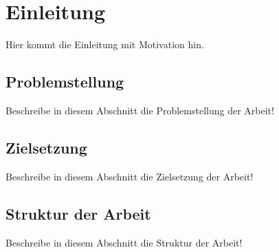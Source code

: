 %
%
%
%
\chapter{Einleitung}
\label{cha:einleitung}
Hier kommt die Einleitung mit Motivation hin.

\section{Problemstellung}
\label{sec:einleitung:problemstellung}
Beschreibe in diesem Abschnitt die Problemstellung der Arbeit!

\section{Zielsetzung}
\label{sec:einleitung:zielsetzung}
Beschreibe in diesem Abschnitt die Zielsetzung der Arbeit!

\section{Struktur der Arbeit}
\label{sec:einleitung:struktur}
Beschreibe in diesem Abschnitt die Struktur der Arbeit!
